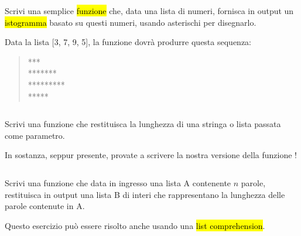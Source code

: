 \documentclass[a4paper,11pt,addpoints]{exam}
\begin{document}
\begin{questions}
    \question[3]  Scrivi una semplice \hl{funzione} che, data una lista di numeri, fornisca in output
    un \hl{istogramma} basato su questi numeri, usando asterischi per disegnarlo.

    \begin{examples}
        \item Data la lista [3, 7, 9, 5], la funzione dovrà produrre questa sequenza:
        \begin{quote}
            ***\\
            *******\\
            *********\\
            *****\\
        \end{quote}
    \end{examples}

    \begin{solution}
        \small\inputminted{python}{solution/008.py}
    \end{solution}

    \questionspace

    \question[3]  Scrivi una funzione che restituisca la lunghezza di una stringa o lista passata come parametro.

    \begin{tips}
        \item In sostanza, seppur presente, provate a scrivere la nostra versione della funzione !
    \end{tips}

    \begin{solution}
        \small\inputminted{python}{solution/009.py}
    \end{solution}

    \questionspace

    \question[2]  Scrivi una funzione che data in ingresso una lista A contenente $n$ parole,
    restituisca in output una lista B di interi che rappresentano la lunghezza delle parole contenute in A.

    \begin{tips}
        \item Questo esercizio può essere risolto anche usando una \hl{list comprehension}.
        \small\inputminted{python}{example/list-comprehension.py}
    \end{tips}

    \begin{solution}
        \small\inputminted{python}{solution/010.py}
    \end{solution}


\end{questions}
\end{document}
